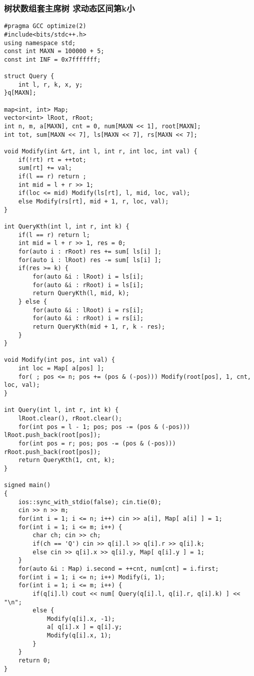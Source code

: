 \subsubsection{树状数组套主席树 求动态区间第k小}
\begin{lstlisting}
#pragma GCC optimize(2)
#include<bits/stdc++.h>
using namespace std;
const int MAXN = 100000 + 5;
const int INF = 0x7fffffff; 

struct Query {
	int l, r, k, x, y;
}q[MAXN];

map<int, int> Map;
vector<int> lRoot, rRoot;
int n, m, a[MAXN], cnt = 0, num[MAXN << 1], root[MAXN];
int tot, sum[MAXN << 7], ls[MAXN << 7], rs[MAXN << 7];

void Modify(int &rt, int l, int r, int loc, int val) {
	if(!rt) rt = ++tot;
	sum[rt] += val;
	if(l == r) return ;
	int mid = l + r >> 1;
	if(loc <= mid) Modify(ls[rt], l, mid, loc, val);
	else Modify(rs[rt], mid + 1, r, loc, val);
}

int QueryKth(int l, int r, int k) {
	if(l == r) return l;
	int mid = l + r >> 1, res = 0;
	for(auto i : rRoot) res += sum[ ls[i] ];
	for(auto i : lRoot) res -= sum[ ls[i] ];
	if(res >= k) {
		for(auto &i : lRoot) i = ls[i];
		for(auto &i : rRoot) i = ls[i];
		return QueryKth(l, mid, k);
	} else {
		for(auto &i : lRoot) i = rs[i];
		for(auto &i : rRoot) i = rs[i];		
		return QueryKth(mid + 1, r, k - res);
	}
}

void Modify(int pos, int val) {
	int loc = Map[ a[pos] ];
	for( ; pos <= n; pos += (pos & (-pos))) Modify(root[pos], 1, cnt, loc, val);
}

int Query(int l, int r, int k) {
	lRoot.clear(), rRoot.clear();
	for(int pos = l - 1; pos; pos -= (pos & (-pos))) lRoot.push_back(root[pos]);
	for(int pos = r; pos; pos -= (pos & (-pos))) rRoot.push_back(root[pos]);
	return QueryKth(1, cnt, k);
}

signed main()
{
	ios::sync_with_stdio(false); cin.tie(0);
	cin >> n >> m;
	for(int i = 1; i <= n; i++) cin >> a[i], Map[ a[i] ] = 1;
	for(int i = 1; i <= m; i++) {
		char ch; cin >> ch;
		if(ch == 'Q') cin >> q[i].l >> q[i].r >> q[i].k;
		else cin >> q[i].x >> q[i].y, Map[ q[i].y ] = 1;
	}
	for(auto &i : Map) i.second = ++cnt, num[cnt] = i.first;
	for(int i = 1; i <= n; i++) Modify(i, 1);
	for(int i = 1; i <= m; i++) {
		if(q[i].l) cout << num[ Query(q[i].l, q[i].r, q[i].k) ] << "\n";
		else {
			Modify(q[i].x, -1);
			a[ q[i].x ] = q[i].y;
			Modify(q[i].x, 1);
		}
	}
	return 0;
}
\end{lstlisting}

